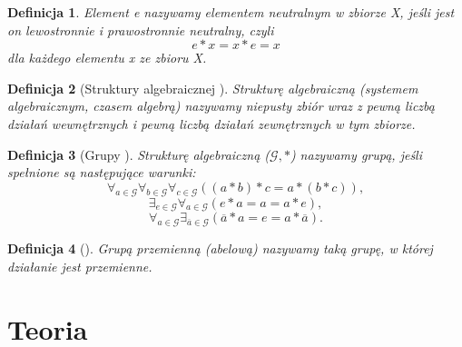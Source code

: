 \documentclass[12pt,a4paper]{report}
\newtheorem{definition}{Definicja}
\begin{document}
\begin{definition}
Element e nazywamy elementem neutralnym w zbiorze X, jeśli jest on lewostronnie i prawostronnie neutralny, czyli
\begin{equation*}
e\ast x = x\ast e = x
\end{equation*}
dla każdego elementu x ze zbioru X.
\end{definition}
\begin{definition}[Struktury algebraicznej \citep{jedrzejewski2011algebra}]
Strukturę algebraiczną (systemem algebraicznym, czasem algebrą) nazywamy niepusty zbiór wraz z pewną liczbą działań wewnętrznych i pewną liczbą działań zewnętrznych w tym zbiorze.
\end{definition}
\begin{definition}[Grupy \citep{jedrzejewski2011algebra}]
Strukturę algebraiczną ($\mathcal{G},\ast$) nazywamy grupą, jeśli spełnione są następujące warunki:
\begin{equation*}
\forall_{a\in \mathcal{G}} \forall_{b\in \mathcal{G}} \forall_{c\in \mathcal{G}} ((a\ast b)\ast c=a\ast (b\ast c)),
\end{equation*}
\begin{equation*}
\exists_{e\in \mathcal{G}} \forall_{a\in \mathcal{G}}(e\ast a=a=a\ast e),
\end{equation*}
\begin{equation*}
\forall_{a \in \mathcal{G}} \exists_{\overline{a}\in\mathcal{G}}(\overline{a}\ast a=e=a\ast \overline{a}).
\end{equation*}
\end{definition}
\begin{definition}[\citep{jedrzejewski2011algebra}]
Grupą przemienną (abelową) nazywamy taką grupę, w której działanie jest przemienne.
\end{definition}



\chapter{Teoria}
\end{document}
